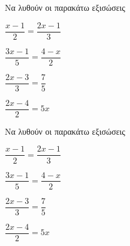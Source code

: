 Να λυθούν οι παρακάτω εξισώσεις
\begin{multicols}{2}
\begin{rlist}[leftmargin=4mm]
\item $ \dfrac{x-1}{2}=\dfrac{2x-1}{3} $
\item $ \dfrac{3x-1}{5}=\dfrac{4-x}{2} $
\item $ \dfrac{2x-3}{3}=\dfrac{7}{5} $
\item $ \dfrac{2x-4}{2}=5x $
\end{rlist}
\end{multicols}
Να λυθούν οι παρακάτω εξισώσεις
\begin{multicols}{2}
\begin{rlist}[leftmargin=4mm]
\item $ \dfrac{x-1}{2}=\dfrac{2x-1}{3} $
\item $ \dfrac{3x-1}{5}=\dfrac{4-x}{2} $
\item $ \dfrac{2x-3}{3}=\dfrac{7}{5} $
\item $ \dfrac{2x-4}{2}=5x $
\end{rlist}
\end{multicols}
